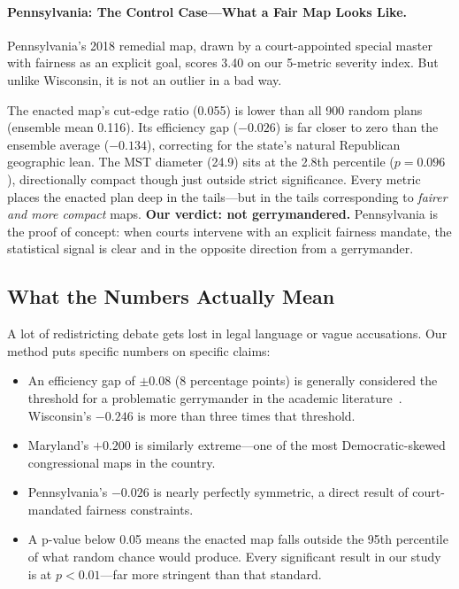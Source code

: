 \documentclass[11pt]{article}
\begin{document}
\paragraph{Pennsylvania: The Control Case---What a Fair Map Looks Like.}
Pennsylvania's 2018 remedial map, drawn by a court-appointed special
master with fairness as an explicit goal, scores 3.40 on our 5-metric
severity index. But unlike Wisconsin, it is not an outlier in a bad way.

The enacted map's cut-edge ratio (0.055) is lower than all 900 random
plans (ensemble mean 0.116). Its efficiency gap ($-0.026$) is far closer
to zero than the ensemble average ($-0.134$), correcting for the state's
natural Republican geographic lean. The MST diameter (24.9) sits at the
2.8th percentile ($p = 0.096$), directionally compact though just outside
strict significance. Every metric places the enacted plan deep in the
tails---but in the tails corresponding to \emph{fairer and more compact}
maps. \textbf{Our verdict: not gerrymandered.} Pennsylvania is the proof
of concept: when courts intervene with an explicit fairness mandate, the
statistical signal is clear and in the opposite direction from a gerrymander.

\subsection*{What the Numbers Actually Mean}

A lot of redistricting debate gets lost in legal language or vague
accusations. Our method puts specific numbers on specific claims:

\begin{itemize}
\item An efficiency gap of $\pm 0.08$ (8 percentage points) is generally
  considered the threshold for a problematic gerrymander in the academic
  literature~\cite{stephanopoulos2015}. Wisconsin's $-0.246$ is more
  than three times that threshold.
\item Maryland's $+0.200$ is similarly extreme---one of the most
  Democratic-skewed congressional maps in the country.
\item Pennsylvania's $-0.026$ is nearly perfectly symmetric, a direct
  result of court-mandated fairness constraints.
\item A p-value below 0.05 means the enacted map falls outside the 95th
  percentile of what random chance would produce. Every significant result
  in our study is at $p < 0.01$---far more stringent than that standard.
\end{itemize}
\end{document}
